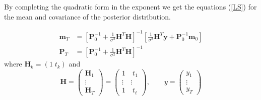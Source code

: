 
By completing the quadratic form in the exponent
we get the equations (\ref{LS}) for the mean and covariance
of the posterior distribution.

\begin{equation}
  \label{LS}
  \begin{aligned}
    \mathbf{m}_T &= \left[ \mathbf{P}^{-1}_0 + \frac{1}{\sigma^2} \mathbf{H}^T \mathbf{H}
                   \right]^{-1} \left[\frac{1}{\sigma^2} \mathbf{H}^T \mathbf{y} +
                   \mathbf{P}^{-1}_0 \mathbf{m}_0 \right] \\
    \mathbf{P}_T &= \left[\mathbf{P}_0^{-1} + \frac{1}{\sigma^2} \mathbf{H}^T \mathbf{H}
                 \right]^{-1}
  \end{aligned}
\end{equation}
where $\mathbf{H}_k = (1 \;t_k)$ and
$$ \mathbf{H} =
\begin{pmatrix} \mathbf{H}_1 \\ \vdots \\ \mathbf{H}_T \end{pmatrix}
= \begin{pmatrix}
  1 \quad t_1 \\
  \vdots \quad \vdots \\
  1 \quad t_t
\end{pmatrix},
\quad \quad y = \begin{pmatrix} y_1 \\ \vdots \\ y_T \end{pmatrix}
$$



